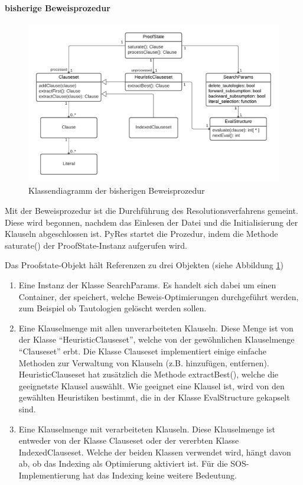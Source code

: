 \paragraph{bisherige Beweisprozedur}
\begin{figure}
	\centering
	\includegraphics[width=1\linewidth]{images/Lucid/PyResProofState}
	\caption{Klassendiagramm der bisherigen Beweisprozedur}
	\label{fig:pyresproofstate}
\end{figure}

Mit der Beweisprozedur ist die Durchführung des Resolutionsverfahrens gemeint. Diese wird begonnen, nachdem das Einlesen der Datei und die Initialisierung der Klauseln abgeschlossen ist. PyRes startet die Prozedur, indem die Methode saturate() der ProofState-Instanz aufgerufen wird.

Das Proofstate-Objekt hält Referenzen zu drei Objekten (siehe Abbildung \ref{fig:pyresproofstate})
\begin{enumerate}
	\item Eine Instanz der Klasse SearchParams. Es handelt sich dabei um einen Container, der speichert, welche Beweis-Optimierungen durchgeführt werden, zum Beispiel ob Tautologien gelöscht werden sollen.
	\item Eine Klauselmenge mit allen unverarbeiteten Klauseln. Diese Menge ist von der Klasse "`HeuristicClauseset"', welche von der gewöhnlichen Klauselmenge "`Clauseset"' erbt. Die Klasse Clauseset implementiert einige einfache Methoden zur Verwaltung von Klauseln (z.B. hinzufügen, entfernen). HeuristicClauseset hat zusätzlich die Methode extractBest(), welche die geeignetste Klausel auswählt. Wie geeignet eine Klausel ist, wird von den gewählten Heuristiken bestimmt, die in der Klasse EvalStructure gekapselt sind.
	\item Eine Klauselmenge mit verarbeiteten Klauseln. Diese Klauselmenge ist entweder von der Klasse Clauseset oder der vererbten Klasse IndexedClauseset. Welche der beiden Klassen verwendet wird, hängt davon ab, ob das Indexing als Optimierung aktiviert ist. Für die SOS-Implementierung hat das Indexing keine weitere Bedeutung.
\end{enumerate}

